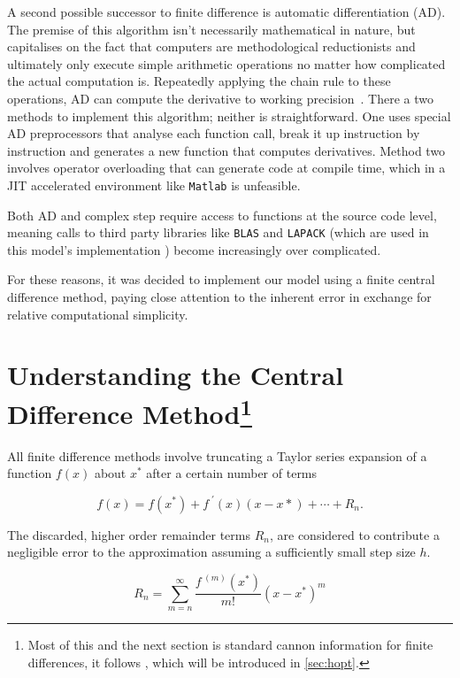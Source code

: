 A second possible successor to finite difference is automatic differentiation (AD). 
The premise of this algorithm isn't necessarily mathematical in nature, but capitalises on the fact that computers are methodological reductionists and ultimately only execute simple arithmetic operations no matter how complicated the actual computation is.
Repeatedly applying the chain rule to these operations, AD can compute the derivative to working precision~\cite{Kedem1980}.
There a two methods to implement this algorithm; neither is straightforward. 
One uses special AD preprocessors that analyse each function call, break it up instruction by instruction and generates a new function that computes derivatives.
Method two involves operator overloading that can generate code at compile time, which in a JIT accelerated environment like \texttt{Matlab} is unfeasible.

Both AD and complex step require access to functions at the source code level, meaning calls to third party libraries like \texttt{BLAS} and \texttt{LAPACK} (which are used in this model's implementation ) become increasingly over complicated.

For these reasons, it was decided to implement our model using a finite central difference method, paying close attention to the inherent error in exchange for relative computational simplicity.

\section[Understanding Central Differences]{Understanding the Central Difference Method\footnote{Most of this and the next section is standard cannon information for finite differences, it follows \citeauthor{Mathur2012}, which will be introduced in \cref{sec:hopt}.}}

All finite difference methods involve truncating a Taylor series expansion of a function $f(x)$ about $x^*$ after a certain number of terms

\begin{equation}
    f(x) = f(x^*) + f^{\;\prime}(x)(x-x*) + \cdots + R_n.
\end{equation}

The discarded, higher order remainder terms $R_n$, are considered to contribute a negligible error to the approximation assuming a sufficiently small step size $h$.

\begin{equation}
    R_n = \sum_{m=n}^\infty \frac{f^{\;(m)}(x^*)}{m!}(x-x^*)^m
\end{equation}


